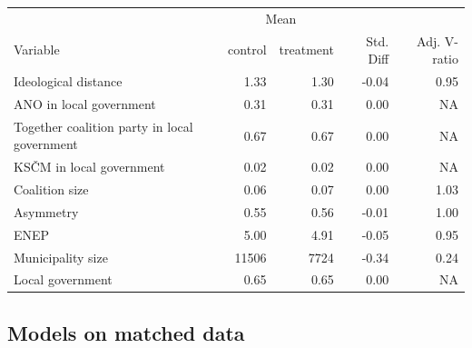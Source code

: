 \documentclass[]{interact}
\theoremstyle{plain}%
\theoremstyle{definition}
\theoremstyle{remark}
\begin{document}
\begin{tabular}{|l|rr|r|r|}
\hline
  & \multicolumn{2}{c|}{Mean} &  &  \\
Variable  & control & treatment & Std. Diff &	Adj. V-ratio\\
\hline
Ideological distance & 1.33 & 1.30 & -0.04 & 0.95 \\
\hline
ANO in local government & 0.31 & 0.31 & 0.00 & NA\\
\hline
Together coalition party in local government & 0.67 & 0.67 & 0.00 & NA\\
\hline
KSČM in local government & 0.02 & 0.02 & 0.00 & NA\\
\hline
Coalition size & 0.06 & 0.07 & 0.00 & 1.03 \\
\hline
Asymmetry & 0.55 & 0.56 & -0.01 & 1.00 \\
\hline
ENEP & 5.00 & 4.91 & -0.05 & 0.95 \\
\hline
Municipality size & 11506 & 7724 & -0.34 & 0.24 \\
\hline
Local government & 0.65 & 0.65 & 0.00 & NA\\
\hline
\end{tabular}

\subsection{Models on matched data \label{tab:5}}

\end{document}
